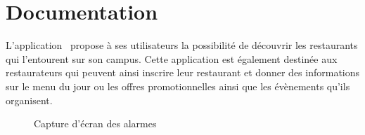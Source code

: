 \section{Documentation}

L'application \appname~propose à ses utilisateurs la possibilité de découvrir les restaurants qui l'entourent sur son campus. Cette application est également destinée aux restaurateurs qui peuvent ainsi inscrire leur restaurant et donner des informations sur le menu du jour ou les offres promotionnelles ainsi que les évènements qu'ils organisent.


\begin{figure}[H]
    \label{fig-alarmes}
    \noindent{}
    \caption{Capture d'écran des alarmes}
\end{figure}

